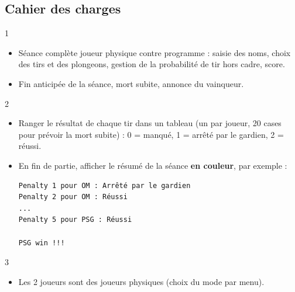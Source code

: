 \subsection*{Cahier des charges}
\begin{UPSTICahierDesCharges}{1}
\begin{itemize}
  \item Séance complète joueur physique contre programme : saisie des noms, choix des tirs et des plongeons, gestion de la probabilité de tir hors cadre, score.
  \item Fin anticipée de la séance, mort subite, annonce du vainqueur.
\end{itemize}
\end{UPSTICahierDesCharges}

\begin{UPSTICahierDesCharges}{2}
\begin{itemize}
  \item Ranger le résultat de chaque tir dans un tableau (un par joueur, 20 cases pour prévoir la mort subite) : 0 = manqué, 1 = arrêté par le gardien, 2 = réussi.
  \item En fin de partie, afficher le résumé de la séance \textbf{en couleur}, par exemple :
\begin{verbatim}
Penalty 1 pour OM : Arrêté par le gardien
Penalty 2 pour OM : Réussi
...
Penalty 5 pour PSG : Réussi

PSG win !!!
\end{verbatim}
\end{itemize}
\end{UPSTICahierDesCharges}

\begin{UPSTICahierDesCharges}{3}
\begin{itemize}
  \item Les 2 joueurs sont des joueurs physiques (choix du mode par menu).
\end{itemize}
\end{UPSTICahierDesCharges}
